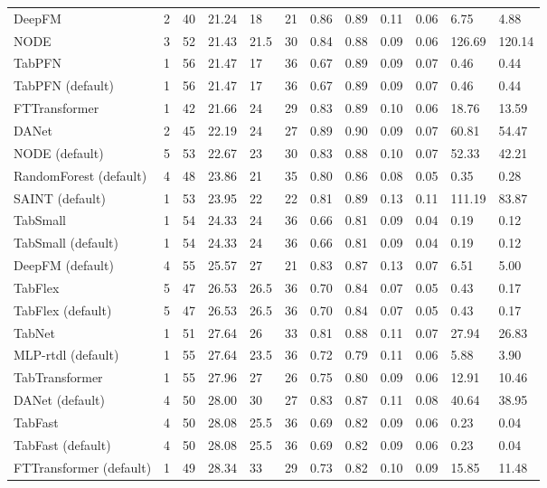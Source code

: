 \begin{tabular}{lllllrllllll}
DeepFM & 2 & 40 & 21.24 & 18 & 21 & 0.86 & 0.89 & 0.11 & 0.06 & 6.75 & 4.88 \\
NODE & 3 & 52 & 21.43 & 21.5 & 30 & 0.84 & 0.88 & 0.09 & 0.06 & 126.69 & 120.14 \\
TabPFN & 1 & 56 & 21.47 & 17 & 36 & 0.67 & 0.89 & 0.09 & 0.07 & 0.46 & 0.44 \\
TabPFN (default) & 1 & 56 & 21.47 & 17 & 36 & 0.67 & 0.89 & 0.09 & 0.07 & 0.46 & 0.44 \\
FTTransformer & 1 & 42 & 21.66 & 24 & 29 & 0.83 & 0.89 & 0.10 & 0.06 & 18.76 & 13.59 \\
DANet & 2 & 45 & 22.19 & 24 & 27 & 0.89 & 0.90 & 0.09 & 0.07 & 60.81 & 54.47 \\
NODE (default) & 5 & 53 & 22.67 & 23 & 30 & 0.83 & 0.88 & 0.10 & 0.07 & 52.33 & 42.21 \\
RandomForest (default) & 4 & 48 & 23.86 & 21 & 35 & 0.80 & 0.86 & 0.08 & 0.05 & 0.35 & 0.28 \\
SAINT (default) & 1 & 53 & 23.95 & 22 & 22 & 0.81 & 0.89 & 0.13 & 0.11 & 111.19 & 83.87 \\
TabSmall & 1 & 54 & 24.33 & 24 & 36 & 0.66 & 0.81 & 0.09 & 0.04 & 0.19 & 0.12 \\
TabSmall (default) & 1 & 54 & 24.33 & 24 & 36 & 0.66 & 0.81 & 0.09 & 0.04 & 0.19 & 0.12 \\
DeepFM (default) & 4 & 55 & 25.57 & 27 & 21 & 0.83 & 0.87 & 0.13 & 0.07 & 6.51 & 5.00 \\
TabFlex & 5 & 47 & 26.53 & 26.5 & 36 & 0.70 & 0.84 & 0.07 & 0.05 & 0.43 & 0.17 \\
TabFlex (default) & 5 & 47 & 26.53 & 26.5 & 36 & 0.70 & 0.84 & 0.07 & 0.05 & 0.43 & 0.17 \\
TabNet & 1 & 51 & 27.64 & 26 & 33 & 0.81 & 0.88 & 0.11 & 0.07 & 27.94 & 26.83 \\
MLP-rtdl (default) & 1 & 55 & 27.64 & 23.5 & 36 & 0.72 & 0.79 & 0.11 & 0.06 & 5.88 & 3.90 \\
TabTransformer & 1 & 55 & 27.96 & 27 & 26 & 0.75 & 0.80 & 0.09 & 0.06 & 12.91 & 10.46 \\
DANet (default) & 4 & 50 & 28.00 & 30 & 27 & 0.83 & 0.87 & 0.11 & 0.08 & 40.64 & 38.95 \\
TabFast & 4 & 50 & 28.08 & 25.5 & 36 & 0.69 & 0.82 & 0.09 & 0.06 & 0.23 & 0.04 \\
TabFast (default) & 4 & 50 & 28.08 & 25.5 & 36 & 0.69 & 0.82 & 0.09 & 0.06 & 0.23 & 0.04 \\
FTTransformer (default) & 1 & 49 & 28.34 & 33 & 29 & 0.73 & 0.82 & 0.10 & 0.09 & 15.85 & 11.48 \\

\end{tabular}
